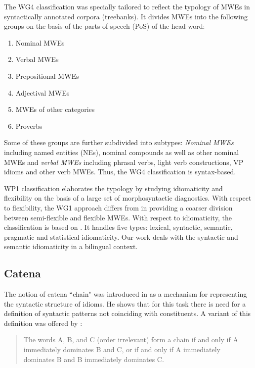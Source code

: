 \documentclass[output=paper]{langsci/langscibook}
\begin{document}
The WG4 classification was specially tailored to reflect the typology of
MWEs in syntactically annotated corpora (treebanks). It divides MWEs into
the following groups on the basis of the parts-of-speech (PoS) of the head
word:

\begin{enumerate}
\item Nominal MWEs
\item Verbal MWEs
\item Prepositional MWEs
\item Adjectival MWEs
\item MWEs of other categories
\item Proverbs
\end{enumerate}

Some of these groups are further subdivided into subtypes: {\em Nominal
MWEs} including named entities (NEs), nominal compounds as well as other
nominal MWEs and {\em verbal MWEs} including phrasal verbs, light verb
constructions, VP idioms and other verb MWEs. Thus, the WG4 classification
is syntax-based.

WP1 classification elaborates the typology by studying  idiomaticity and
flexibility on the basis of a large set of morphosyntactic diagnostics. With
respect to flexibility, the WG1 approach differs from \citet{Sag:2002} in
providing a coarser division between semi-flexible and flexible MWEs. With
respect to idiomaticity, the classification is based on
\citet{Baldwin2010}. It handles five types: lexical, syntactic, semantic,
pragmatic and statistical idiomaticity. Our work deals with the syntactic and
semantic idiomaticity in a bilingual context.


\subsection{Catena}


The notion of catena ``chain" was introduced in \citet[284]{OGrady:98} as a
mechanism for representing the syntactic structure of idioms. He shows that
for this task there is need for a definition of syntactic patterns
not coinciding with constituents. A variant of this definition was offered by \citet{Osborne2006}:
\begin{quotation}
The words A, B, and C (order irrelevant)
form a chain if and only if A immediately dominates B and C, or if and only
if A immediately dominates B and B immediately dominates C. \citep[258]{Osborne2006}
\end{quotation}
\end{document}
